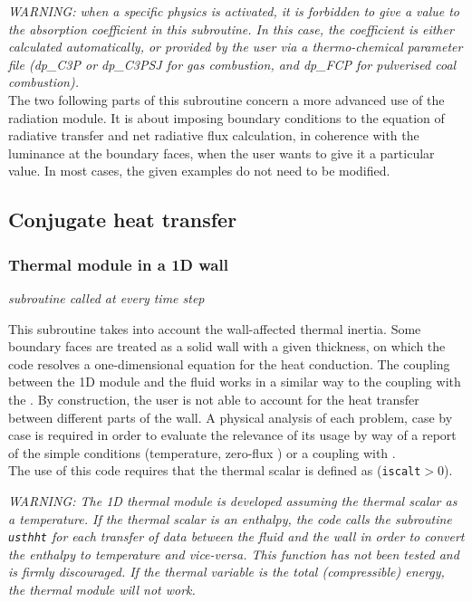 {{{{\em WARNING: when a specific physics is activated, it is forbidden to
give a value to the absorption coefficient in this subroutine. In this
case, the coefficient is either calculated automatically, or provided by the user {\em via} a
thermo-chemical parameter file (dp\_C3P or dp\_C3PSJ for gas combustion,
and dp\_FCP for pulverised coal combustion).}\\

\noindent
The two following parts of this subroutine concern a more advanced use
of the radiation module. It is about imposing boundary conditions to the
equation of radiative transfer and net radiative flux calculation, in
coherence with the luminance at the boundary faces, when the user wants
to give it a particular value. In most cases, the given examples do not
need to be modified.

\subsection{Conjugate heat transfer}

\subsubsection{Thermal module in a 1D wall}

\noindent
\textit{subroutine called at every time step}

This subroutine takes into account the wall-affected thermal inertia.
 Some boundary faces are treated as a solid wall with a given thickness, on
 which the code resolves a one-dimensional equation for the heat conduction.
 The coupling between the 1D module and the fluid works in a similar way to
 the coupling with the \syrthes. By construction, the user is not able to
 account for the heat transfer between different parts of the wall. A physical
 analysis of each problem, case by case is required in order to evaluate the relevance
 of its usage by way of a report of the simple conditions (temperature, zero-flux
 ) or a coupling with \syrthes.\\

The use of this code requires that the thermal scalar is
defined as (\texttt{iscalt}$>0$).

{\em WARNING: The 1D thermal module is developed assuming the thermal scalar
 as a temperature. If the thermal scalar is an enthalpy, the code calls the
 subroutine \texttt{usthht} for each transfer of data between the fluid
 and the wall in order to convert the enthalpy to temperature and vice-versa.
 This function has not been tested and is firmly discouraged. If the thermal
 variable is the total (compressible) energy, the thermal module will not work.}

}}}

